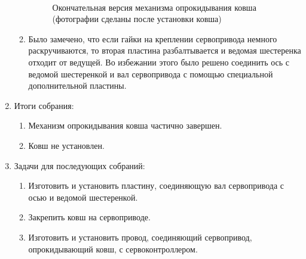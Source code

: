 \begin{enumerate}
\begin{enumerate}
\begin{figure}[H]
\begin{minipage}[h]{0.47\linewidth}
      	\end{minipage}
      	\vfill
      	\begin{minipage}[h]{0.2\linewidth}
      		\center  
      	\end{minipage}
      	\begin{minipage}[h]{0.6\linewidth}
      		\caption{Окончательная версия механизма опрокидывания ковша (фотографии сделаны после установки ковша)}
      	\end{minipage}
      \end{figure}
      	      
      \item Было замечено, что если гайки на креплении сервопривода немного раскручиваются, то вторая пластина разбалтывается и ведомая шестеренка отходит от ведущей. Во избежании этого было решено соединить ось с ведомой шестеренкой и вал сервопривода с помощью специальной дополнительной пластины.
      
 	\end{enumerate}
 	\item Итоги собрания:
 	\begin{enumerate}
 		
 	  \item Механизм опрокидывания ковша частично завершен.
 		
 	  \item Ковш не установлен. 
 		
 	\end{enumerate}
 	\item Задачи для последующих собраний:
 	\begin{enumerate}
 		
 	  \item Изготовить и установить пластину, соединяющую вал сервопривода с осью и ведомой шестеренкой.
 		
 	  \item Закрепить ковш на сервоприводе.
 		
 	  \item Изготовить и установить провод, соединяющий сервопривод, опрокидывающий ковш, с сервоконтроллером.
 				
 	\end{enumerate}
\end{enumerate}
\fillpage